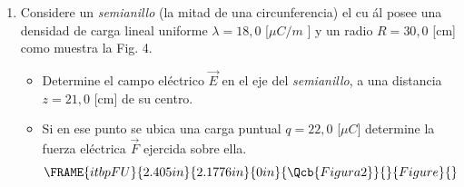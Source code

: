 \documentclass[onecolumn]{article}
\begin{document}
\begin{enumerate}
\begin{enumerate}
\item La fuerza el\'{e}ctrica $\vec{F}$ sobre la carga $q.$%
\begin{equation*}
\FRAME{itbpFU}{3.8527in}{2.1041in}{0in}{\Qcb{Figura 3}}{}{Figure}{\special%
{language "Scientific Word";type "GRAPHIC";maintain-aspect-ratio
TRUE;display "USEDEF";valid_file "T";width 3.8527in;height 2.1041in;depth
0in;original-width 12.3167in;original-height 6.7075in;cropleft "0";croptop
"1";cropright "1";cropbottom "0";tempfilename
'TCTQCF02.bmp';tempfile-properties "XPR";}}
\end{equation*}
\end{enumerate}

\item Considere un \emph{semianillo }(la mitad de una circunferencia) el cu%
\'{a}l posee una densidad de carga lineal uniforme $\lambda =18,0$ [$\mu C/m$%
] y un radio $R=30,0$ [cm] como muestra la Fig. 4.

\begin{itemize}
\item Determine el campo el\'{e}ctrico $\vec{E}$ en el eje del \emph{%
semianillo}, a una distancia $z=21,0$ [cm] de su centro.

\item Si en ese punto se ubica una carga puntual $q=22,0$ [$\mu C]$
determine la fuerza el\'{e}ctrica $\vec{F}$ ejercida sobre ella.%
\begin{equation*}
\FRAME{itbpFU}{2.405in}{2.1776in}{0in}{\Qcb{Figura 2}}{}{Figure}{\special%
{language "Scientific Word";type "GRAPHIC";maintain-aspect-ratio
TRUE;display "USEDEF";valid_file "T";width 2.405in;height 2.1776in;depth
0in;original-width 4.6164in;original-height 4.1753in;cropleft "0";croptop
"1";cropright "1";cropbottom "0";tempfilename '../clases
I-2021/230045/TCTQHM03.wmf';tempfile-properties "XPR";}}
\end{equation*}
\end{itemize}
\end{enumerate}
\end{document}

